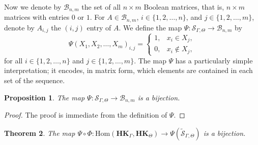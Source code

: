 \documentclass[pdflatex,sn-mathphys-num]{sn-jnl}
\newcommand{\hk}{\mathbf{HK}_{\Theta}}
\newcommand{\hkg}{\mathbf{HK}_{\Gamma}}
\newcommand{\sgt}{\widetilde{\mathcal{S}}_{\Gamma,\Theta}}
\newtheorem{theorem}{Theorem}[section]
\newtheorem{proposition}[theorem]{Proposition}
\theoremstyle{definition}
\theoremstyle{remark}
\begin{document}
Now we denote by $\mathcal{B}_{n, m}$ the set of all $n \times m$ Boolean matrices, that is, $n \times m$ matrices with entries $0$ or $1$.
For $A \in \mathcal{B}_{n, m}$, $i \in \{1, 2, \dots, n\}$, and $j \in \{1, 2, \dots, m\}$, denote by $A_{i, j}$ the $(i, j)$ entry of $A$.
We define the map $\Psi : \mathcal{S}_{\Gamma, \Theta} \to \mathcal{B}_{n, m}$ by
\[
\Psi(X_1, X_2, \dots, X_m)_{i, j} = 
\begin{cases}
1, & x_i \in X_j, \\
0, & x_i \notin X_j,
\end{cases}
\]
for all $i \in \{1, 2, \dots, n\}$ and $j \in \{1, 2, \dots, m\}$.
The map $\Psi$ has a particularly simple interpretation; it encodes, in matrix form, which elements are contained in each set of the sequence.

\begin{proposition}\label{psi:bijective}
   The map $\Psi : \mathcal{S}_{\Gamma, \Theta} \to \mathcal{B}_{n, m}$ is a bijection.
\end{proposition}

\begin{proof}
   The proof is immediate from the definition of $\Psi$.
\end{proof}

\begin{theorem}\label{hom:main}
   The map $\Psi \circ \Phi : \mathrm{Hom}(\hkg, \hk) \to \Psi(\sgt)$ is a bijection.
\end{theorem}
\end{document}
